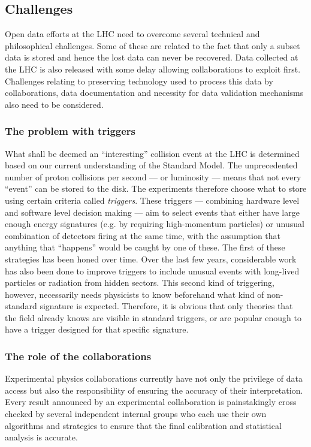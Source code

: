 \documentclass[10pt]{article}
\begin{document}
\subsection{Challenges}
%
Open data efforts at the LHC need to overcome several technical and philosophical challenges. Some of these are related to the fact that only a subset data is stored and hence the lost data can never be recovered. Data collected at the LHC is also released with some delay allowing collaborations to exploit first. Challenges relating to preserving technology used to process this data by collaborations, data documentation and necessity for data validation mechanisms also need to be considered.


\subsubsection{The problem with triggers}
%
What shall be deemed an ``interesting'' collision event at the LHC is determined based on our current understanding of the Standard Model.   The unprecedented number of proton collisions per second  --- or luminosity --- means that not every ``event'' can be stored to the disk.  The experiments therefore choose what to store using certain criteria called {\it triggers}.  These triggers --- combining hardware level and software level decision making --- aim to select events that either have large enough energy signatures (e.g. by requiring high-momentum particles) or unusual combination of detectors firing at the same time, with the assumption that anything that ``happens'' would be caught by one of these.  The first of these strategies has been honed over time.  Over the last few years, considerable work has also been done to improve triggers to include unusual events with long-lived particles or radiation from hidden sectors.  This second kind of triggering, however, necessarily needs physicists to know beforehand what kind of non-standard signature is expected.  Therefore, it is obvious that  only theories that the field already knows are visible in standard triggers, or are popular enough to have a trigger designed for that specific signature.


\subsubsection{The role of the collaborations}
%
Experimental physics collaborations currently have not only the privilege of data access but also the responsibility of ensuring the accuracy of their interpretation.  Every result announced by an experimental collaboration is painstakingly cross checked by several independent internal groups who each use their own algorithms and strategies to ensure that the final calibration and statistical analysis is accurate.  
\end{document}
